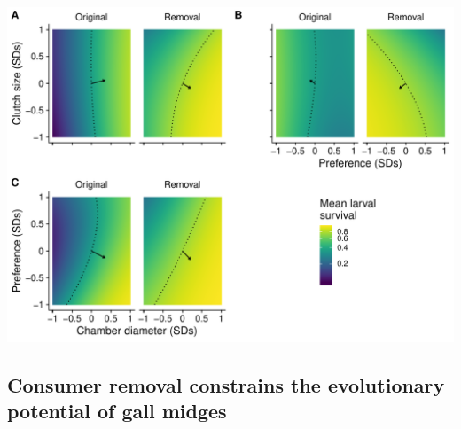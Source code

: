 \documentclass[11pt,]{article}
\let\origfigure\figure
\let\endorigfigure\endfigure
\renewenvironment{figure}[1][2] {
    \expandafter\origfigure\expandafter[H]
} {
    \endorigfigure
}
\begin{document}
\begin{figure}
\centering
\includegraphics{../analyses/MV_landscapes.pdf}
\caption{\label{fig:MV_Landscape}Two dimensional view of
\textbf{fitness} landscapes of gall midge phenotypes in the original
food web and with the removal of larval parasitoids. Each panel
corresponds to a different combination of phenotypic traits: clutch size
and chamber diameter (A); clutch size and oviposition preference (B);
oviposition preference and chamber diameter (C). Arrows represent mean
estimates of directional selection gradients, while
\textbf{dotted lines} represent predicted larval survival of the mean
phenotype in each food-web treatment. Notice that arrows point more
toward a corner of the \textbf{fitness} landscape for each combination
of traits with the removal of larval parasitoids compared to the
original food web. This indicates that the removal of consumers more
strongly favored a specific combination of traits. Note that mean larval
survival is plotted on a natural log scale to reflect the mathematical
definition of the \textbf{fitness} landscape.}
\end{figure}

\bigskip

\subsection{Consumer removal constrains the evolutionary potential of
gall
midges}\label{consumer-removal-constrains-the-evolutionary-potential-of-gall-midges}
\end{document}
